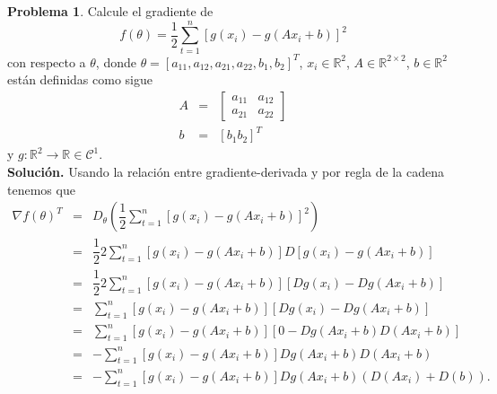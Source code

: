 \documentclass[12pt,letterpaper]{article}
\theoremstyle{definition}
\newtheorem{problm}{Problema}
\begin{document}
\begin{problm}
	Calcule el gradiente de
	\[ f(\theta) = \dfrac{1}{2} \sum_{t = 1}^{n} [g(x_i) - g(Ax_i + b)]^2 \]
	con respecto a $ \theta $, donde $ \theta = [a_{11}, a_{12}, a_{21}, a_{22}, b_1, b_2]^T $, $ x_i \in \mathbb{R}^2 $, $ A\in\mathbb{R}^{2 \times 2} $, $ b\in\mathbb{R}^2 $ están definidas como sigue
	\begin{eqnarray*}
		A & = & \left[\begin{matrix}
				a_{11} & a_{12} \\
				a_{21} & a_{22} 
			\end{matrix}\right]  \\
		b & = & [b_1 b_2]^T
	\end{eqnarray*}
	y $ g: \mathbb{R}^2 \to \mathbb{R} \in\mathcal{C}^1 $.
	\\
	\textbf{Solución.} Usando la relación entre gradiente-derivada y por regla de la cadena tenemos que
	\begin{eqnarray*}
		\nabla f(\theta)^T & = &  D_{\theta} \left( \dfrac{1}{2} \sum_{t = 1}^{n} [g(x_i) - g(Ax_i + b)]^2 \right) \\
						   & = & \dfrac{1}{2} 2 \sum_{t = 1}^{n} [g(x_i) - g(Ax_i + b)] D [g(x_i) - g(Ax_i + b)] \\
						   & = & \dfrac{1}{2} 2 \sum_{t = 1}^{n} [g(x_i) - g(Ax_i + b)] [D g(x_i) - D g(Ax_i + b)] \\
						   & = & \sum_{t = 1}^{n} [g(x_i) - g(Ax_i + b)] [D g(x_i) - D g(Ax_i + b)] \\
						   & = & \sum_{t = 1}^{n} [g(x_i) - g(Ax_i + b)] [0 - D g(Ax_i + b) D (A x_i + b)] \\
						   & = & - \sum_{t = 1}^{n} [g(x_i) - g(Ax_i + b)] D g(Ax_i + b) D(A x_i + b) \\ 
						   & = & - \sum_{t = 1}^{n} [g(x_i) - g(Ax_i + b)] D g(Ax_i + b) (D(A x_i) + D(b)).
	\end{eqnarray*}
\end{problm}
\end{document}
